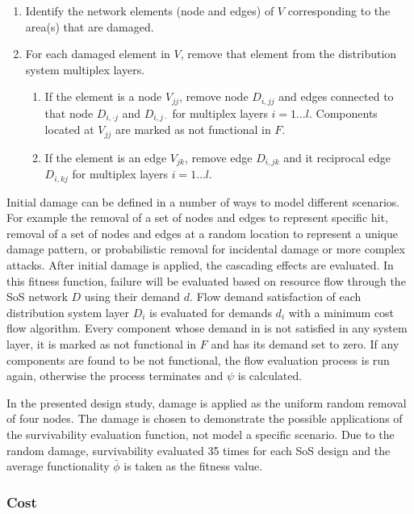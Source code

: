 \documentclass[preprint,12pt]{elsarticle}
\begin{document}
\begin{enumerate}
	\item  Identify the network elements (node and edges) of $V$ corresponding to the area(s) that are damaged.
	\item For each damaged element in $V$, remove that element from the distribution system multiplex layers.
	\begin{enumerate}
		\item If the element is a node $V_{jj}$, remove node $D_{i,jj}$ and edges connected to that node $D_{i,\cdot j}$ and $D_{i,j \cdot}$ for multiplex layers $i=1\ldots l$. Components located at $V_{jj}$ are marked as not functional in $F$.
		\item If the element is an edge $V_{jk}$, remove edge $D_{i,jk}$ and it reciprocal edge $D_{i,kj}$ for multiplex layers $i=1\ldots l$.
	\end{enumerate}
\end{enumerate}


Initial damage can be defined in a number of ways to model different scenarios. For example the removal of a set of nodes and edges to represent specific hit, removal of a set of nodes and edges at a random location to represent a unique damage pattern, or probabilistic removal for incidental damage or more complex attacks. After initial damage is applied, the cascading effects are evaluated. In this fitness function, failure will be evaluated based on resource flow through the SoS network $D$ using their demand $d$. Flow demand satisfaction of each distribution system layer $D_i$ is evaluated for demands $d_i$ with a minimum cost flow algorithm. Every component whose demand in is not satisfied in any system layer, it is marked as not functional in $F$ and has its demand set to zero. If any components are found to be not functional, the flow evaluation process is run again, otherwise the process terminates and $\psi$ is calculated. 


In the presented design study, damage is applied as the uniform random removal of four nodes. The damage is chosen to demonstrate the possible applications of the survivability evaluation function, not model a specific scenario. Due to the random damage, survivability evaluated 35 times for each SoS design and the average functionality $\bar{\phi}$ is taken as the fitness value.


\subsubsection{Cost}
\end{document}
